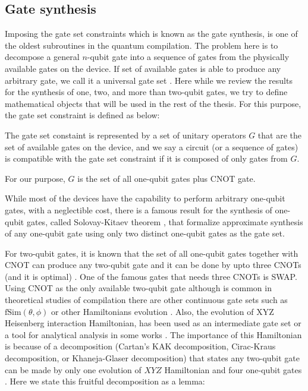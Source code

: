\subsection{Gate synthesis}

Imposing the gate set constraints which is known as the gate synthesis, is one of the oldest subroutines in the quantum compilation. The problem here is to decompose a general $n$-qubit gate into a sequence of gates from the physically available gates on the device. If set of available gates is able to produce any arbitrary gate, we call it a universal gate set \cite{barenco1995}. Here while we review the results for the synthesis of one, two, and more than two-qubit gates, we try to define mathematical objects that will be used in the rest of the thesis. For this purpose, the gate set constraint is defined as below:

\begin{definition}
  The gate set constaint is represented by a set of unitary operators $G$ that are the set of available gates on the device, and we say a circuit (or a sequence of gates) is compatible with the gate set constraint if it is composed of only gates from $G$.

  For our purpose, $G$ is the set of all one-qubit gates plus CNOT gate.
\end{definition}

While most of the devices have the capability to perform arbitrary one-qubit gates, with a neglectible cost, there is a famous result for the synthesis of one-qubit gates, called Solovay-Kitaev theorem \cite{dawson2006}, that formalize approximate synthesis of any one-qubit gate using only two distinct one-qubit gates as the gate set.

For two-qubit gates, it is known that the set of all one-qubit gates together with CNOT can produce any two-qubit gate and it can be done by upto three CNOTs (and it is optimal) \cite{vatan2004,vidal2004}. One of the famous gates that needs three CNOTs is SWAP. Using CNOT as the only available two-qubit gate although is common in theoretical studies of compilation \cite{zulehner2018,siraichi2018,li2019,zhang2021,zhou2020,itoko2019,murali2019} there are other continuous gate sets such as $\mathrm{fSim}(\theta, \phi)$ \cite{foxen2020} or other Hamiltonians evolution \cite{childsa}. Also, the evolution of XYZ Heisenberg interaction Hamiltonian, has been used as an intermediate gate set or a tool for analytical analysis in some works \cite{sousa2006,vidal2004}. The importance of this Hamiltonian is because of a decomposition (Cartan's KAK decomposition, Cirac-Kraus decomposition, or Khaneja-Glaser decomposition) that states any two-qubit gate can be made by only one evolution of $XYZ$ Hamiltonian and four one-qubit gates \cite{kraus2001,khaneja2001}. Here we state this fruitful decomposition as a lemma:


